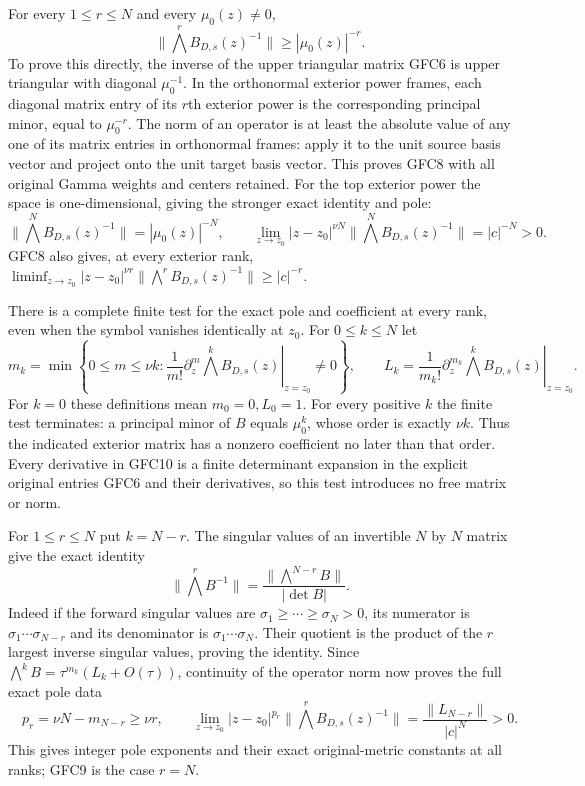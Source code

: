 \documentclass[11pt]{article}
\begin{document}
For every $1\le r\le N$ and every $\mu_0(z)\ne0$,
\[
 \boxed{\qquad
 \|\bigwedge^r B_{D,s}(z)^{-1}\|
                \ge |\mu_0(z)|^{-r}.
 \qquad}\tag{GFC8}
\]
To prove this directly, the inverse of the upper triangular matrix
GFC6 is upper triangular with diagonal $\mu_0^{-1}$.
In the orthonormal exterior power frames, each diagonal matrix entry
of its $r$th exterior power is the corresponding principal minor,
equal to $\mu_0^{-r}$. The norm of an operator is at least the
absolute value of any one of its matrix entries in orthonormal
frames: apply it to the unit source basis vector and project onto
the unit target basis vector. This proves GFC8 with all original
Gamma weights and centers retained.
For the top exterior power the space is one-dimensional, giving
the stronger exact identity and pole:
\[
 \|\bigwedge^N B_{D,s}(z)^{-1}\|=|\mu_0(z)|^{-N},\qquad
 \lim_{z\to z_0}|z-z_0|^{\nu N}
       \|\bigwedge^N B_{D,s}(z)^{-1}\|=|c|^{-N}>0.
 \tag{GFC9}
\]
GFC8 also gives, at every exterior rank,
$\liminf_{z\to z_0}|z-z_0|^{\nu r}
\|\bigwedge^rB_{D,s}(z)^{-1}\|\ge|c|^{-r}$.

There is a complete finite test for the exact pole and coefficient at
every rank, even when the symbol vanishes identically at $z_0$.
For $0\le k\le N$ let
\[
 m_k=\min\left\{0\le m\le\nu k:
     \left.\frac1{m!}\partial_z^m\bigwedge^kB_{D,s}(z)
          \right|_{z=z_0}\ne0\right\},\qquad
 L_k=\left.\frac1{m_k!}\partial_z^{m_k}
                  \bigwedge^kB_{D,s}(z)\right|_{z=z_0}.
 \tag{GFC10}
\]
For $k=0$ these definitions mean $m_0=0,L_0=1$.
For every positive $k$ the finite test terminates: a principal minor
of $B$ equals $\mu_0^k$, whose order is exactly $\nu k$.
Thus the indicated exterior matrix has a nonzero coefficient no
later than that order. Every derivative in GFC10 is a finite
determinant expansion in the explicit original entries GFC6 and
their derivatives, so this test introduces no free matrix or norm.

For $1\le r\le N$ put $k=N-r$. The singular values of an
invertible $N$ by $N$ matrix give the exact identity
\[
 \|\bigwedge^rB^{-1}\|
       =\frac{\|\bigwedge^{N-r}B\|}{|\det B|}.
 \tag{GFC11}
\]
Indeed if the forward singular values are
$\sigma_1\ge\cdots\ge\sigma_N>0$, its numerator is
$\sigma_1\cdots\sigma_{N-r}$ and its denominator is
$\sigma_1\cdots\sigma_N$. Their quotient is the product of
the $r$ largest inverse singular values, proving the identity.
Since $\bigwedge^kB=\tau^{m_k}(L_k+O(\tau))$, continuity
of the operator norm now proves the full exact pole data
\[
 \boxed{\quad
 p_r=\nu N-m_{N-r}\ge\nu r,\qquad
 \lim_{z\to z_0}|z-z_0|^{p_r}
       \|\bigwedge^rB_{D,s}(z)^{-1}\|
       =\frac{\|L_{N-r}\|}{|c|^N}>0.
 \quad}\tag{GFC12}
\]
This gives integer pole exponents and their exact original-metric
constants at all ranks; GFC9 is the case $r=N$.
\end{document}
